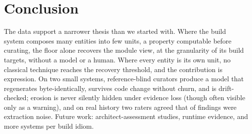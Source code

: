 \section{Conclusion}
\label{sec:conclusion}


The data support a narrower thesis than we started with. Where the build system composes many
entities into few units, a property computable before curating, the floor alone recovers the
module view, at the granularity of its build targets, without a model or a human. Where every
entity is its own unit, no classical technique reaches the recovery threshold, and the
contribution is expression. On two small systems, reference-blind curators produce a model that
regenerates byte-identically, survives code change without churn, and is drift-checked; erosion
is never silently hidden under evidence loss (though often visible only as a warning), and on
real history two raters agreed that \rqSixHistNoise{} of \rqSixHistFindings{} findings were
extraction noise. Future work: architect-assessment studies, runtime evidence, and more systems
per build idiom.
